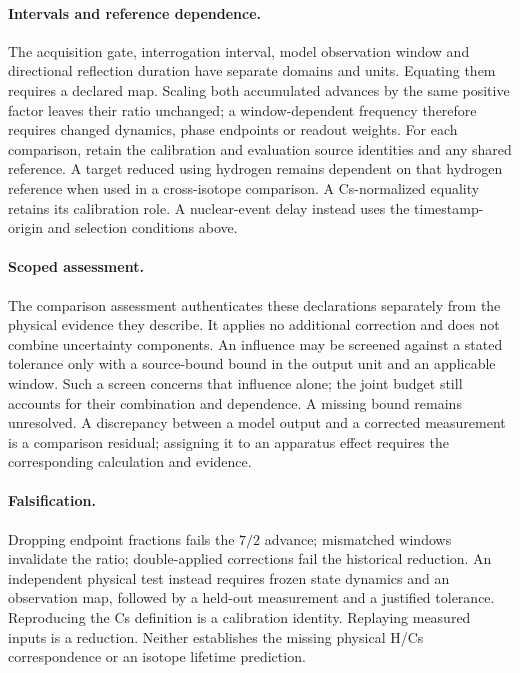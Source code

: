\paragraph{Intervals and reference dependence.}
The acquisition gate, interrogation interval, model observation window and
directional reflection duration have separate domains and units. Equating
them requires a declared map. Scaling both accumulated advances by the same
positive factor leaves their ratio unchanged; a window-dependent frequency
therefore requires changed dynamics, phase endpoints or readout weights.
For each comparison, retain the calibration and evaluation source identities
and any shared reference. A target reduced using hydrogen remains dependent
on that hydrogen reference when used in a cross-isotope comparison.
A Cs-normalized equality retains its calibration role. A nuclear-event delay
instead uses the timestamp-origin and selection conditions above.

\paragraph{Scoped assessment.}
The comparison assessment authenticates these declarations separately from
the physical evidence they describe. It applies no additional correction and
does not combine uncertainty components. An influence may be screened against
a stated tolerance only with a source-bound bound in the output unit and an
applicable window. Such a screen concerns that influence alone; the joint
budget still accounts for their combination and dependence.
A missing bound remains unresolved. A discrepancy between a model output and
a corrected measurement is a comparison residual; assigning it to an
apparatus effect requires the corresponding calculation and evidence.

\paragraph{Falsification.}
Dropping endpoint fractions fails the \(7/2\) advance; mismatched windows
invalidate the ratio; double-applied corrections fail the historical reduction.
An independent physical test instead requires frozen state dynamics and an
observation map, followed by a held-out measurement and a justified tolerance.
Reproducing the Cs definition is a calibration identity. Replaying measured
inputs is a reduction. Neither establishes the missing physical H/Cs
correspondence or an isotope lifetime prediction.

